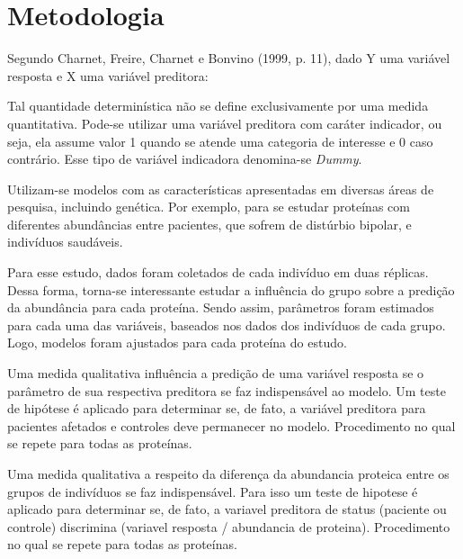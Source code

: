 \documentclass[12pt, a4paper]{article}
\begin{document}
	\author{Yasmine Brasco}
	\date{25/09/2016}

\section{Metodologia}
Segundo Charnet, Freire, Charnet e Bonvino (1999, p. 11), dado Y uma variável resposta e X uma variável preditora:\\


Tal quantidade determinística não se define exclusivamente por uma medida quantitativa. Pode-se utilizar uma variável preditora com caráter indicador, ou seja, ela assume valor 1 quando se atende uma categoria de interesse e 0 caso contrário. Esse tipo de variável indicadora denomina-se \textit{Dummy}. 

Utilizam-se modelos com as características apresentadas em diversas áreas de pesquisa, incluindo genética. Por exemplo, para se estudar proteínas com diferentes abundâncias entre pacientes, que sofrem de distúrbio bipolar, e indivíduos saudáveis. 

Para esse estudo, dados foram coletados de cada indivíduo em duas réplicas. Dessa forma, torna-se interessante estudar a influência do grupo sobre a predição da abundância para cada proteína. Sendo assim, parâmetros foram estimados para cada uma das variáveis, baseados nos dados dos indivíduos de cada grupo. Logo, modelos foram ajustados para cada proteína do estudo.

Uma medida qualitativa influência a predição de uma variável resposta se o parâmetro de sua respectiva preditora se faz indispensável ao modelo. Um teste de hipótese é aplicado para determinar se, de fato, a variável preditora para pacientes afetados e controles deve permanecer no modelo. Procedimento no qual se repete para todas as proteínas.

Uma medida qualitativa a respeito da diferença da abundancia proteica entre os grupos de indivíduos se faz indispensável. Para isso um teste de hipotese é aplicado para determinar se, de fato, a variavel preditora de status (paciente ou controle) discrimina (variavel resposta / abundancia de proteina). Procedimento no qual se repete para todas as proteínas.
\end{document}

